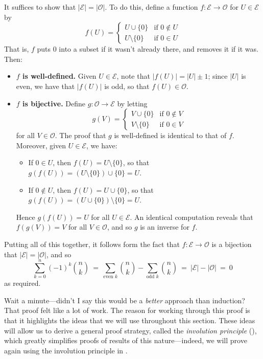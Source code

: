 \begin{cproof}
It suffices to show that $|\mathcal{E}| = |\mathcal{O}|$. To do this, define a function $f : \mathcal{E} \to \mathcal{O}$ for $U \in \mathcal{E}$ by
\[ f(U) = \begin{cases} U \cup \{ 0 \} & \text{if $0 \not\in U$} \\ U \setminus \{ 0 \} & \text{if $0 \in U$} \end{cases} \]
That is, $f$ puts $0$ into a subset if it wasn't already there, and removes it if it was. Then:
\begin{itemize}
\item \textbf{$f$ is well-defined.} Given $U \in \mathcal{E}$, note that $|f(U)| = |U| \pm 1$; since $|U|$ is even, we have that $|f(U)|$ is odd, so that $f(U) \in \mathcal{O}$.
\item \textbf{$f$ is bijective.} Define $g : \mathcal{O} \to \mathcal{E}$ by letting
\[ g(V) = \begin{cases} V \cup \{ 0 \} & \text{if $0 \not\in V$} \\ V \setminus \{ 0 \} & \text{if $0 \in V$} \end{cases} \]
for all $V \in \mathcal{O}$. The proof that $g$ is well-defined is identical to that of $f$. Moreover, given $U \in \mathcal{E}$, we have:
\begin{itemize}
\item If $0 \in U$, then $f(U) = U \setminus \{ 0 \}$, so that $g(f(U)) = (U \setminus \{ 0 \}) \cup \{ 0 \} = U$.
\item If $0 \not\in U$, then $f(U) = U \cup \{ 0 \}$, so that $g(f(U)) = (U \cup \{ 0 \}) \setminus \{ 0 \} = U$.
\end{itemize}
Hence $g(f(U)) = U$ for all $U \in \mathcal{E}$. An identical computation reveals that $f(g(V)) = V$ for all $V \in \mathcal{O}$, and so $g$ is an inverse for $f$.
\end{itemize}

Putting all of this together, it follows form the fact that $f : \mathcal{E} \to \mathcal{O}$ is a bijection that $|\mathcal{E}| = |\mathcal{O}|$, and so
\[ \sum_{k=0}^n (-1)^k \binom{n}{k} ~=~ \sum_{\text{even } k} \binom{n}{k} - \sum_{\text{odd } k } \binom{n}{k} ~=~ |\mathcal{E}| - |\mathcal{O}| ~=~ 0 \]
as required.
\end{cproof}

Wait a minute---didn't I say this would be a \textit{better} approach than induction? That proof felt like a lot of work. The reason for working through this proof is that it highlights the ideas that we will use throughout this section. These ideas will allow us to derive a general proof strategy, called the \textit{involution principle} (), which greatly simplifies proofs of results of this nature---indeed, we will prove  again using the involution principle in .

